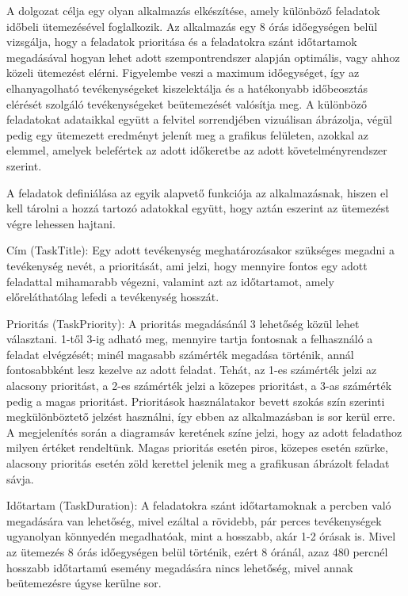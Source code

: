 
A dolgozat célja egy olyan alkalmazás elkészítése, amely különböző feladatok időbeli ütemezésével foglalkozik. Az alkalmazás egy 8 órás időegységen belül vizsgálja, hogy a feladatok prioritása és a feladatokra szánt időtartamok megadásával hogyan lehet adott szempontrendszer alapján optimális, vagy ahhoz közeli ütemezést elérni. Figyelembe veszi a maximum időegységet, így az elhanyagolható tevékenységeket kiszelektálja és a hatékonyabb időbeosztás elérését szolgáló tevékenységeket beütemezését valósítja meg. A különböző feladatokat adataikkal együtt a felvitel sorrendjében vizuálisan ábrázolja, végül pedig egy ütemezett eredményt jelenít meg a grafikus felületen, azokkal az elemmel, amelyek belefértek az adott időkeretbe az adott követelményrendszer szerint.

A feladatok definiálása az egyik alapvető funkciója az alkalmazásnak, hiszen el kell tárolni a hozzá tartozó adatokkal együtt, hogy aztán eszerint az ütemezést végre lehessen hajtani. 


Cím (TaskTitle): Egy adott tevékenység meghatározásakor szükséges megadni a tevékenység nevét, a prioritását, ami jelzi, hogy mennyire fontos egy adott feladattal mihamarabb végezni, valamint azt az időtartamot, amely előreláthatólag lefedi a tevékenység hosszát.

Prioritás (TaskPriority): A prioritás megadásánál 3 lehetőség közül lehet választani. 1-től 3-ig adható meg, mennyire tartja fontosnak a felhasználó a feladat elvégzését; minél magasabb számérték megadása történik, annál fontosabbként lesz kezelve az adott feladat. Tehát, az 1-es számérték jelzi az alacsony prioritást, a 2-es számérték jelzi a közepes prioritást, a 3-as számérték pedig a magas prioritást. Prioritások használatakor bevett szokás szín szerinti megkülönböztető jelzést használni, így ebben az alkalmazásban is sor kerül erre. A megjelenítés során a diagramsáv keretének színe jelzi, hogy az adott feladathoz milyen értéket rendeltünk. Magas prioritás esetén piros, közepes esetén szürke, alacsony prioritás esetén zöld kerettel jelenik meg a grafikusan ábrázolt feladat sávja.

Időtartam (TaskDuration): A feladatokra szánt időtartamoknak a percben való megadására van lehetőség, mivel ezáltal a rövidebb, pár perces tevékenységek ugyanolyan könnyedén megadhatóak, mint a hosszabb, akár 1-2 órásak is. Mivel az ütemezés 8 órás időegységen belül történik, ezért 8 óránál, azaz 480 percnél hosszabb időtartamú esemény megadására nincs lehetőség, mivel annak beütemezésre úgyse kerülne sor.

